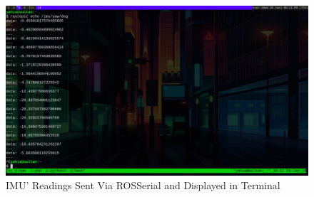 \begin{figure}[h!]
	\centering
	\includegraphics[scale=0.25]{./Figures/imu.jpg}
	\caption{IMU' Readings Sent Via ROSSerial and Displayed in Terminal}
	\label{fig:ref2}
\end{figure}







% 